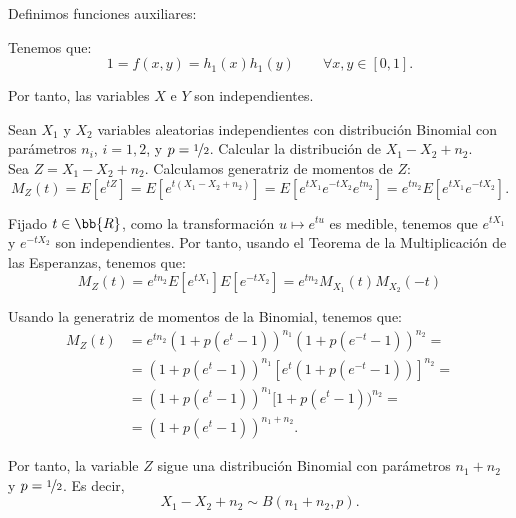 \begin{ejercicio}
\begin{enumerate}
        Definimos funciones auxiliares:

        Tenemos que:
        \begin{equation*}
            1=f(x,y)=h_1(x)h_1(y) \qquad \forall x,y\in [0,1].
        \end{equation*}

        Por tanto, las variables $X$ e $Y$ son independientes.
    \end{enumerate}
\end{ejercicio}

\begin{ejercicio}
    Sean $X_1$ y $X_2$ variables aleatorias independientes con distribución Binomial con parámetros $n_i$, $i = 1,2$, y $p = \nicefrac{1}{2}$. Calcular la distribución de $X_1 - X_2 + n_2$.\\

    Sea $Z=X_1-X_2+n_2$. Calculamos generatriz de momentos de $Z$:
    \begin{equation*}
        M_Z(t) = E[e^{tZ}] = E[e^{t(X_1-X_2+n_2)}] = E[e^{tX_1}e^{-tX_2}e^{tn_2}] = e^{tn_2}E[e^{tX_1}e^{-tX_2}].
    \end{equation*}

    Fijado $t\in \bb{R}$, como la transformación $u\mapsto e^{tu}$ es medible, tenemos que $e^{tX_1}$ y $e^{-tX_2}$ son independientes. Por tanto, usando el Teorema de la Multiplicación de las Esperanzas, tenemos que:
    \begin{equation*}
        M_Z(t) = e^{tn_2}E[e^{tX_1}]E[e^{-tX_2}] = e^{tn_2}M_{X_1}(t)M_{X_2}(-t)
    \end{equation*}

    Usando la generatriz de momentos de la Binomial, tenemos que:
    \begin{align*}
        M_Z(t) &= e^{tn_2}\left(1+p(e^t-1)\right)^{n_1}\left(1+p(e^{-t}-1)\right)^{n_2} =\\
        &=(1+p(e^t-1))^{n_1}[e^t(1+p(e^{-t}-1))]^{n_2}=\\
        &=(1+p(e^t-1))^{n_1}[1+p(e^{t}-1))^{n_2}
        =\\&=
        (1+p(e^t-1))^{n_1+n_2}.
    \end{align*}

    Por tanto, la variable $Z$ sigue una distribución Binomial con parámetros $n_1+n_2$ y $p=\nicefrac{1}{2}$. Es decir,
    \begin{equation*}
        X_1-X_2+n_2\sim B(n_1+n_2,p).
    \end{equation*}
\end{ejercicio}

